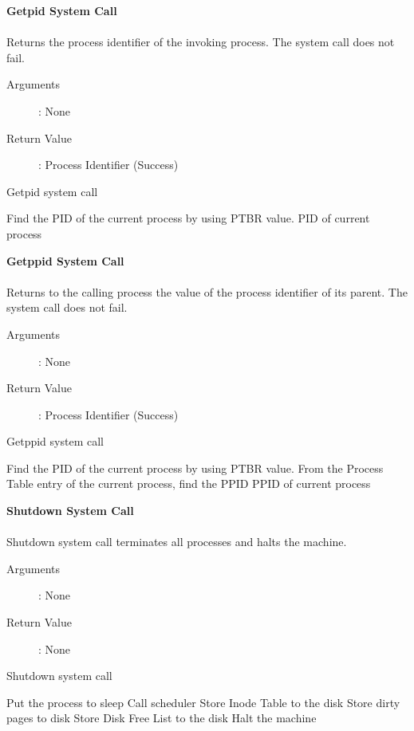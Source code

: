 \documentclass[10pt]{article}
\begin{document}
\vspace{16mm}
\textbf{Getpid System Call}\\ \\
 Returns the process identifier of the invoking process. The system call does not fail.
\begin{description}
\item[Arguments]: None
\item[Return Value]: Process Identifier (Success) 
\end{description} 
\begin{algorithm}
\caption{Getpid system call}
\begin{algorithmic}
\STATE Find the PID of the current process by using PTBR value.
\RETURN PID of current process
\end{algorithmic}
\end{algorithm}
\textbf{Getppid System Call}\\ \\
 Returns to the calling process the value of the process identifier of its parent. The system call does not fail.
\begin{description}
\item[Arguments]: None
\item[Return Value]: Process Identifier (Success) 
\end{description} 
\begin{algorithm}
\caption{Getppid system call}
\begin{algorithmic}
\STATE Find the PID of the current process by using PTBR value.
\STATE From the Process Table entry of the current process, find the PPID
\RETURN PPID of current process
\end{algorithmic}
\end{algorithm}
\textbf{Shutdown System Call}
\\ \\
Shutdown system call terminates all processes and halts the machine. \begin{description}
\item[Arguments]: None
\item[Return Value]: None
\end{description} 
\begin{algorithm}
\caption{Shutdown system call}
\begin{algorithmic}
    \STATE Put the process to sleep
    \STATE Call scheduler
\ENDWHILE
\STATE Store Inode Table to the disk
\STATE Store dirty pages to disk
\STATE Store Disk Free List to the disk
\STATE Halt the machine
\RETURN 
\end{algorithmic}
\end{algorithm}
\vspace{20mm}
\end{document}
